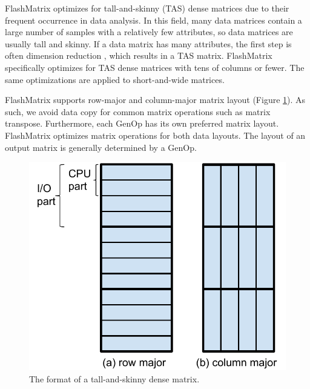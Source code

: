 FlashMatrix optimizes for tall-and-skinny (TAS) dense matrices due to their
frequent occurrence in data analysis. In this field, many data matrices contain
a large number of samples with a relatively few attributes, so 
data matrices are usually tall and skinny. If a data matrix has many
attributes, the first step is often dimension reduction \cite{Jain00}, which
results in a TAS matrix. FlashMatrix specifically optimizes for TAS dense
matrices with tens of columns or fewer. The same optimizations are applied
to short-and-wide matrices.

FlashMatrix supports row-major and column-major matrix layout (Figure
\ref{fig:tas_mat}). As such,
we avoid data copy for common matrix operations such as matrix transpose.
Furthermore, each GenOp has its own preferred matrix layout. FlashMatrix
optimizes matrix operations for both data layouts. The layout of an output
matrix is generally determined by a GenOp.

\begin{figure}
	\centering
	\includegraphics[scale=0.5]{./dense_matrix.pdf}
	\caption{The format of a tall-and-skinny dense matrix.}
	\label{fig:tas_mat}
\end{figure}

